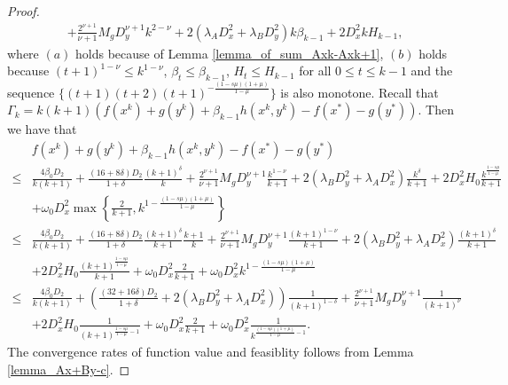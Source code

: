 \documentclass{article}
\numberwithin{equation}{section}
\begin{document}
\begin{proof}
\begin{align}
        & + \frac{2^{\nu+1}}{\nu+1}M_gD_y^{\nu+1}k^{2-\nu} +2(\lambda_AD_x^2+ \lambda_BD_y^2)k\beta_{k-1} +2D_x^2kH_{k-1}, \nonumber 
    \end{align}
    where $(a)$ holds because of Lemma \ref{lemma_of_sum_Axk-Axk+1}, $(b)$ holds because 
    $(t+1)^{1-\nu} \leq k^{1-\nu}$, $\beta_t \leq \beta_{k-1}$, $H_t\leq H_{k-1}$ for all $0\leq t\leq k-1$ 
    and the sequence $\{(t+1)(t+2)(t+1)^{-\frac{(1-s\mu)(1+\mu)}{1-\mu}}\}$ is also monotone. 
    Recall that $\Gamma_k = k(k+1)(f(x^k)+g(y^k)+\beta_{k-1}h(x^k,y^k)-f(x^*)-g(y^*))$. Then we have that
    \begin{align}
        &f(x^k)+g(y^k)+\beta_{k-1}h(x^k,y^k)-f(x^*)-g(y^*) \nonumber \\
        \leq& \frac{4\beta_0D_2}{k(k+1)}+\frac{(16+8\delta)D_2}{1+\delta}\frac{(k+1)^{\delta}}{k}
        +\frac{2^{\nu+1}}{\nu+1}M_gD_y^{\nu+1}\frac{k^{1-\nu}}{k+1}+2(\lambda_BD_y^2+\lambda_AD_x^2)\frac{k^{\delta}}{k+1} 
        +2D_x^2H_0\frac{k^{\frac{1-s\mu}{1-\mu}}}{k+1} \nonumber \\
        &+ \omega_0D_x^2\max\left\{\frac{2}{k+1}, k^{1-\frac{(1-s\mu)(1+\mu)}{1-\mu}}\right\} \nonumber \\
        \leq & \frac{4\beta_0D_2}{k(k+1)}+\frac{(16+8\delta)D_2}{1+\delta}\frac{(k+1)^{\delta}}{k+1}\frac{k+1}{k}
        +\frac{2^{\nu+1}}{\nu+1}M_gD_y^{\nu+1}\frac{(k+1)^{1-\nu}}{k+1}+2(\lambda_BD_y^2+\lambda_AD_x^2)\frac{(k+1)^{\delta}}{k+1} 
         \nonumber \\
        &+2D_x^2H_0\frac{(k+1)^{\frac{1-s\mu}{1-\mu}}}{k+1}+ \omega_0D_x^2\frac{2}{k+1}+\omega_0D_x^2k^{1-\frac{(1-s\mu)(1+\mu)}{1-\mu}}  \nonumber \\
        \leq & \frac{4\beta_0D_2}{k(k+1)}+\left(\frac{(32+16\delta)D_2}{1+\delta}+2(\lambda_BD_y^2+\lambda_AD_x^2)\right)\frac{1}{(k+1)^{1-\delta}}
        +\frac{2^{\nu+1}}{\nu+1}M_gD_y^{\nu+1}\frac{1}{(k+1)^{\nu}}     \nonumber \\
        &+2D_x^2H_0\frac{1}{(k+1)^{\frac{1-s\mu}{1-\mu}-1}}+ \omega_0D_x^2\frac{2}{k+1}+\omega_0D_x^2\frac{1}{k^{\frac{(1-s\mu)(1+\mu)}{1-\mu}-1}}.  \nonumber
    \end{align}
    The convergence rates of function value and feasiblity follows from Lemma \ref{lemma_Ax+By-c}. 


\end{proof}
\end{document}
